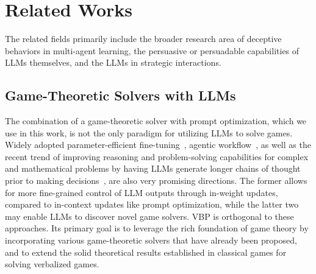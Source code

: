 \section{Related Works}
\label{sec:related}

The related fields primarily include the broader research area of deceptive behaviors in multi-agent learning, the persuasive or persuadable capabilities of LLMs themselves, and the LLMs in strategic interactions. 

\subsection{Game-Theoretic Solvers with LLMs}
The combination of a game-theoretic solver with prompt optimization, which we use in this work, is not the only paradigm for utilizing LLMs to solve games. 
Widely adopted parameter-efficient fine-tuning~\citep{xu2023parameter,han2024parameter}, agentic workflow~\citep{mao2023alympics,hua2024game,guo2024can,fan2024can,lore2024strategic,duan2024gtbench}, as well as the recent trend of improving reasoning and problem-solving capabilities for complex and mathematical problems by having LLMs generate longer chains of thought prior to making decisions~\citep{zelikman2022star,zelikman2024quiet,o1,guo2025deepseek}, are also very promising directions. 
The former allows for more fine-grained control of LLM outputs through in-weight updates, compared to in-context updates like prompt optimization, while the latter two may enable LLMs to discover novel game solvers.
VBP is orthogonal to these approaches.
Its primary goal is to leverage the rich foundation of game theory by incorporating various game-theoretic solvers that have already been proposed, and to extend the solid theoretical results established in classical games for solving verbalized games.





